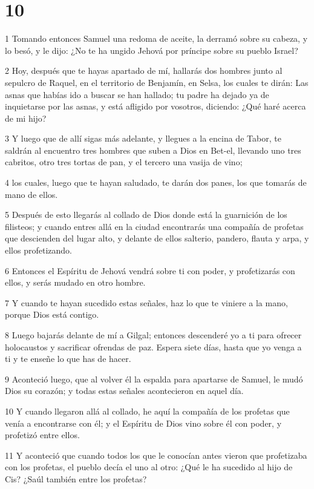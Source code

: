 \chapter{10}

\par 1 Tomando entonces Samuel una redoma de aceite, la derramó sobre su cabeza, y lo besó, y le dijo: ¿No te ha ungido Jehová por príncipe sobre su pueblo Israel?
\par 2 Hoy, después que te hayas apartado de mí, hallarás dos hombres junto al sepulcro de Raquel, en el territorio de Benjamín, en Selsa, los cuales te dirán: Las asnas que habías ido a buscar se han hallado; tu padre ha dejado ya de inquietarse por las asnas, y está afligido por vosotros, diciendo: ¿Qué haré acerca de mi hijo?
\par 3 Y luego que de allí sigas más adelante, y llegues a la encina de Tabor, te saldrán al encuentro tres hombres que suben a Dios en Bet-el, llevando uno tres cabritos, otro tres tortas de pan, y el tercero una vasija de vino;
\par 4 los cuales, luego que te hayan saludado, te darán dos panes, los que tomarás de mano de ellos.
\par 5 Después de esto llegarás al collado de Dios donde está la guarnición de los filisteos; y cuando entres allá en la ciudad encontrarás una compañía de profetas que descienden del lugar alto, y delante de ellos salterio, pandero, flauta y arpa, y ellos profetizando.
\par 6 Entonces el Espíritu de Jehová vendrá sobre ti con poder, y profetizarás con ellos, y serás mudado en otro hombre.
\par 7 Y cuando te hayan sucedido estas señales, haz lo que te viniere a la mano, porque Dios está contigo.
\par 8 Luego bajarás delante de mí a Gilgal; entonces descenderé yo a ti para ofrecer holocaustos y sacrificar ofrendas de paz. Espera siete días, hasta que yo venga a ti y te enseñe lo que has de hacer.
\par 9 Aconteció luego, que al volver él la espalda para apartarse de Samuel, le mudó Dios su corazón; y todas estas señales acontecieron en aquel día.
\par 10 Y cuando llegaron allá al collado, he aquí la compañía de los profetas que venía a encontrarse con él; y el Espíritu de Dios vino sobre él con poder, y profetizó entre ellos.
\par 11 Y aconteció que cuando todos los que le conocían antes vieron que profetizaba con los profetas, el pueblo decía el uno al otro: ¿Qué le ha sucedido al hijo de Cis? ¿Saúl también entre los profetas?
